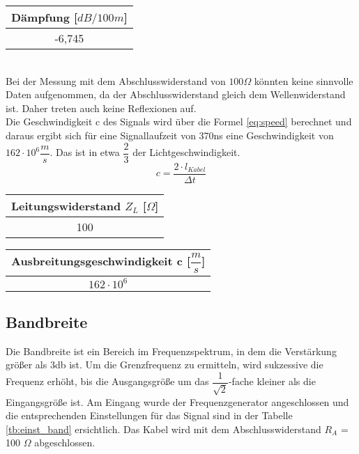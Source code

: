 \begin{table}[!h]
	\centering
	\begin{tabular}{|c|}
		\hline 
		Dämpfung [$dB / 100m$]		\\ 
		\hline 
		-6,745 	\\ 
		\hline 
	\end{tabular}
\end{table}
~\\
Bei der Messung mit dem Abschlusswiderstand von $100 \Omega$ könnten keine sinnvolle Daten aufgenommen, da der Abschlusswiderstand gleich dem Wellenwiderstand ist. Daher treten auch keine Reflexionen auf.
~\\
Die Geschwindigkeit c des Signals wird über die Formel \ref{eq:speed} berechnet und daraus ergibt sich für eine Signallaufzeit von 370ns eine Geschwindigkeit von $162\cdot 10^{6} \dfrac{m}{s}$. Das ist in etwa $\dfrac{2}{3}$ der Lichtgeschwindigkeit.
\begin{equation}
	c = \dfrac{2 \cdot l_{Kabel}}{\Delta t}
	\label{eq:speed}
\end{equation}

\begin{table}[!h]
	\centering
	\begin{tabular}{|c|}
		\hline 
		Leitungswiderstand $Z_L$ [$\Omega$]		\\ 
		\hline 
		100	\\ 
		\hline 
	\end{tabular}
\end{table}
\begin{table}[!h]
	\centering
	\begin{tabular}{|c|}
		\hline 
		Ausbreitungsgeschwindigkeit c [$\dfrac{m}{s}$]		\\ 
		\hline 
		$162\cdot 10^{6}$		\\ 
		\hline 
	\end{tabular}
\end{table}


\subsection{Bandbreite}

Die Bandbreite ist ein Bereich im Frequenzspektrum, in dem die Verstärkung größer als 3db ist. Um die Grenzfrequenz zu ermitteln, wird sukzessive die Frequenz erhöht, bis die Ausgangsgröße um das $\dfrac{1}{\sqrt{2}}$-fache kleiner als die Eingangsgröße ist. Am Eingang wurde der Frequenzgenerator angeschlossen und die entsprechenden Einstellungen für das Signal sind in der Tabelle \ref{tb:einst_band} ersichtlich. Das Kabel wird mit dem Abschlusswiderstand $R_A$ = 100 $\Omega$ abgeschlossen.


